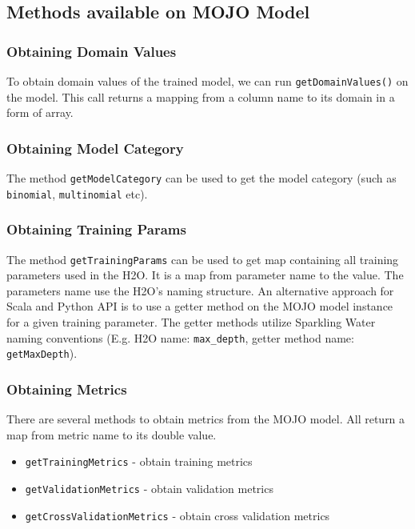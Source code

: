 \subsection{Methods available on MOJO Model}

\subsubsection{Obtaining Domain Values}

To obtain domain values of the trained model, we can run \texttt{getDomainValues()} on the model. This call
returns a mapping from a column name to its domain in a form of array.

\subsubsection{Obtaining Model Category}

The method \texttt{getModelCategory} can be used to get the model category (such as \texttt{binomial}, \texttt{multinomial} etc).

\subsubsection{Obtaining Training Params}

The method \texttt{getTrainingParams} can be used to get map containing all training parameters used in the H2O. It is a map
from parameter name to the value. The parameters name use the H2O's naming structure. An alternative approach for Scala and
Python API is to use a getter method on the MOJO model instance for a given training parameter. The getter methods utilize
Sparkling Water naming conventions (E.g. H2O name: \texttt{max\_depth}, getter method name: \texttt{getMaxDepth}).


\subsubsection{Obtaining Metrics}

There are several methods to obtain metrics from the MOJO model. All return a map from metric name to its double value.

\begin{itemize}
    \item \texttt{getTrainingMetrics} - obtain training metrics
    \item \texttt{getValidationMetrics} - obtain validation metrics
    \item \texttt{getCrossValidationMetrics} - obtain cross validation metrics
\end{itemize}


